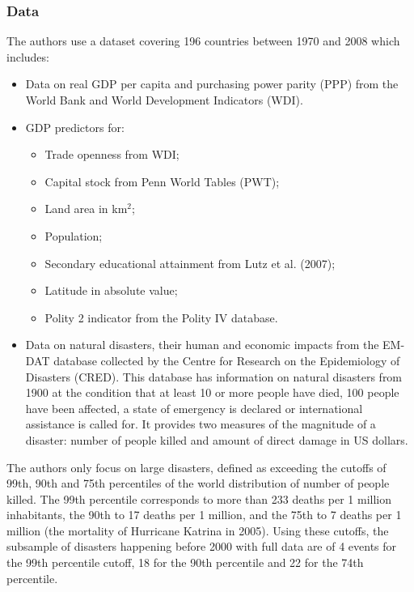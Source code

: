 \documentclass[12pt,a4paper,draft]{article}
\begin{document}
\subsubsection*{Data}
The authors use a dataset covering 196 countries between 1970 and 2008 which includes:
\begin{itemize}
    \item Data on real GDP per capita and purchasing power parity (PPP) from the World 
    Bank and World Development Indicators (WDI).
    \item GDP predictors for:
    \begin{itemize}
        \item Trade openness from WDI;
        \item Capital stock from Penn World Tables (PWT);
        \item Land area in km$^2$;
        \item Population;
        \item Secondary educational attainment from Lutz et al. (2007);
        \item Latitude in absolute value;
        \item Polity 2 indicator from the Polity IV database.
    \end{itemize}
    \item Data on natural disasters, their human and economic impacts from the EM-DAT 
    database collected by the Centre for Research on the Epidemiology of Disasters (CRED). 
    This database has information on natural disasters from 1900 at the condition that 
    at least 10 or more people have died, 100 people have been affected, a state of 
    emergency is declared or international assistance is called for. It provides two measures 
    of the magnitude of a disaster: number of people killed and amount of direct damage in 
    US dollars.
     
\end{itemize}

The authors only focus on large disasters, defined as exceeding the cutoffs of 99th, 90th 
and 75th percentiles of the world distribution of number of people killed. The 99th percentile 
corresponds to more than 233 deaths per 1 million inhabitants, the 90th to 17 deaths per 1 
million, and the 75th to 7 deaths per 1 million (the mortality of Hurricane Katrina in 2005).
Using these cutoffs, the subsample of disasters happening before 2000 with full data are of 4 
events for the 99th percentile cutoff, 18 for the 90th percentile and 22 for the 74th percentile.
\end{document}
